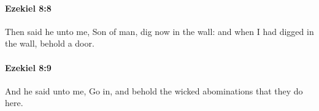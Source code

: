 		\paragraph{Ezekiel 8:8} %
			\label{EZEKIEL-8-8}

			Then said he unto me, Son of man, dig now in the wall: and when I had digged in the wall, behold a door.


		\paragraph{Ezekiel 8:9} %
			\label{EZEKIEL-8-9}

			And he said unto me, Go in, and behold the wicked abominations that they do here.


